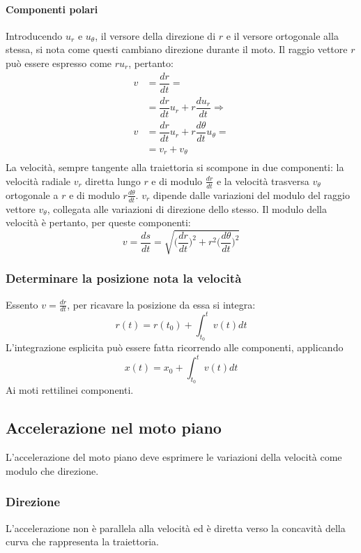			\paragraph{Componenti polari}
			Introducendo $u_r$ e $u_\theta$, il versore della direzione di $r$ e il versore ortogonale alla stessa, si nota come questi cambiano direzione durante il moto.
			Il raggio vettore $r$ pu\`o essere espresso come $ru_r$, pertanto:
			\begin{align*}
				v&=\dfrac{dr}{dt}=\\
				 &=\dfrac{dr}{dt}u_r+r\dfrac{du_r}{dt}\Rightarrow\\
				v&=\dfrac{dr}{dt}u_r+r\dfrac{d\theta}{dt}u_\theta=\\
				 &=v_r+v_\theta\\
			\end{align*}
			La velocit\`a, sempre tangente alla traiettoria si scompone in due componenti: la velocit\`a radiale $v_r$ diretta lungo $r$ e di modulo $\frac{dr}{dt}$ e la velocit\`a trasversa $v_\theta$ ortogonale a $r$ e di modulo $r\frac{d\theta}{dt}$.
			$v_r$ dipende dalle variazioni del modulo del raggio vettore $v_\theta$, collegata alle variazioni di direzione dello stesso.
			Il modulo della velocit\`a \`e pertanto, per queste componenti:
			$$v=\dfrac{ds}{dt}=\sqrt{\biggl(\dfrac{dr}{dt}\biggr)^2+r^2\biggl(\dfrac{d\theta}{dt}\biggr)^2}$$

		\subsubsection{Determinare la posizione nota la velocit\`a}
		Essento $v=\frac{dr}{dt}$, per ricavare la posizione da essa si integra:
		$$r(t)=r(t_0)+\int_{t_0}^tv(t)dt$$
		L'integrazione esplicita pu\`o essere fatta ricorrendo alle componenti, applicando
		$$x(t)=x_0+\int_{t_0}^tv(t)dt$$
		Ai moti rettilinei componenti.

	\subsection{Accelerazione nel moto piano}
	L'accelerazione del moto piano deve esprimere le variazioni della velocit\`a come modulo che direzione.

		\subsubsection{Direzione}
		L'accelerazione non \`e parallela alla velocit\`a ed \`e diretta verso la concavit\`a della curva che rappresenta la traiettoria.

